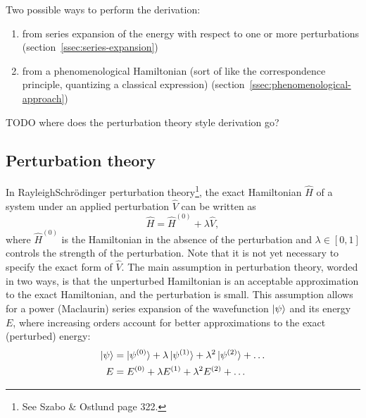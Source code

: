 \documentclass[%
class = book,%
crop = false,%
float = true,%
multi = true,%
preview = false,%
]{standalone}
\let\cite\autocite
\begin{document}
Two possible ways to perform the derivation:

\begin{enumerate}
\item from series expansion of the energy with respect to one or more perturbations (section~\ref{ssec:series-expansion})
\item from a phenomenological Hamiltonian (sort of like the correspondence principle, quantizing a classical expression) (section~\ref{ssec:phenomenological-approach})
\end{enumerate}

TODO where does the perturbation theory style derivation go?

\subsection{Perturbation theory}
\label{ssec:perturbation-theory}

In Rayleigh\textendash{}Schr{\"{o}}dinger perturbation theory\footnote{See Szabo \& Ostlund\cite{szabo1989modern} page 322.}, the exact Hamiltonian \(\hat{H}\) of a system under an applied perturbation \(\hat{V}\) can be written as
\begin{equation}
  \label{eq:perturbed-hamiltonian}
  \hat{H} = \hat{H}^{(0)} + \lambda\hat{V},
\end{equation}
where \(\hat{H}^{(0)}\) is the Hamiltonian in the absence of the perturbation and \(\lambda \in [0,1]\) controls the strength of the perturbation. Note that it is not yet necessary to specify the exact form of \(\hat{V}\). The main assumption in perturbation theory, worded in two ways, is that the unperturbed Hamiltonian is an acceptable approximation to the exact Hamiltonian, and the perturbation is small. This assumption allows for a power (Maclaurin) series expansion of the wavefunction \(\ket{\psi}\) and its energy \(E\), where increasing orders account for better approximations to the exact (perturbed) energy:
\begin{align}
  \label{eq:expansion-wavefunction}
  \ket{\psi} &= \ket{\psi^{(0)}} + \lambda\ket{\psi^{(1)}} + \lambda^{2}\ket{\psi^{(2)}} + \dots \\
  \label{eq:expansion-energy}
  E &= E^{(0)} + \lambda E^{(1)} + \lambda^{2} E^{(2)} + \dots
\end{align}
\end{document}
